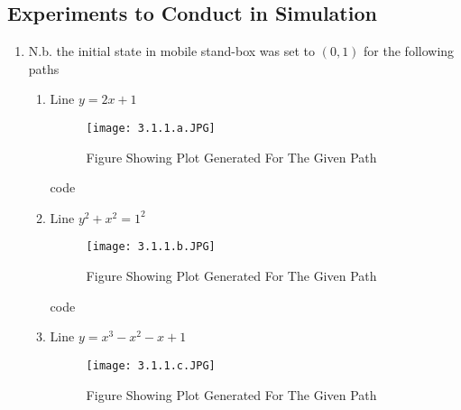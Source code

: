 \documentclass{article}
\begin{document}
\subsection{Experiments to Conduct in Simulation} 
\begin{enumerate}
    \item 
        N.b. the initial state in mobile stand-box was set to $(0,1)$ for the following paths  \\ 
        \begin{enumerate}
            \item 
            
             Line $ y = 2x + 1$ \\ 
                \renewcommand{\thefigure}{3.1.1.a}
                \begin{center}
                    \begin{figure}[H]
                        \centering
                        \texttt{[image: 3.1.1.a.JPG]}
                         \caption{Figure Showing Plot Generated For The Given Path}
                    \end{figure}
                \end{center}
            
             code  \\ 
             
             
            
            \item 
                   Line $ y^2 + x^2  = 1^2$ \\ 
                \renewcommand{\thefigure}{3.1.1.b}
                \begin{center}
                    \begin{figure}[H]
                        \centering
                        \texttt{[image: 3.1.1.b.JPG]}
                         \caption{Figure Showing Plot Generated For The Given Path}
                    \end{figure}
                \end{center}
            
             code  \\ 
             
            
            \item 
             Line $ y = x^3 - x^2 - x + 1 $\\ 
                \renewcommand{\thefigure}{3.1.1.c}
                \begin{center}
                    \begin{figure}[H]
                        \centering
                        \texttt{[image: 3.1.1.c.JPG]}
                         \caption{Figure Showing Plot Generated For The Given Path}
                    \end{figure}
                \end{center}
            

\end{enumerate}
\end{enumerate}
\end{document}
